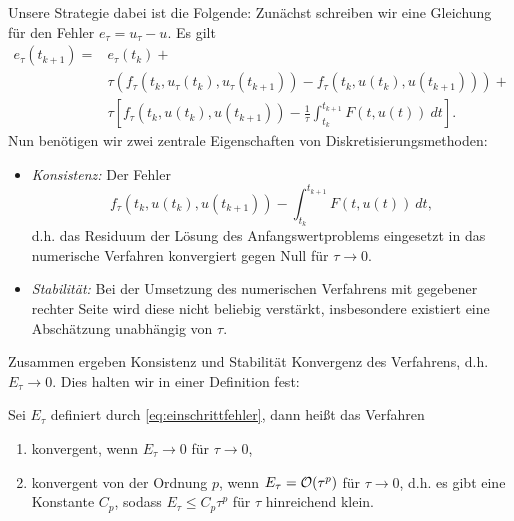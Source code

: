 Unsere Strategie dabei ist die Folgende: Zunächst schreiben wir eine Gleichung für den Fehler $e_\tau = u_\tau - u$. Es gilt
%
\begin{align*} 
e_\tau(t_{k+1}) =& e_\tau(t_k) +\\ 
&\tau (f_\tau(t_k,u_\tau(t_k),u_\tau(t_{k+1})) - f_\tau(t_k,u(t_k),u(t_{k+1}))) 
+ \\ & \tau 
\left[ f_\tau(t_k,u(t_k),u(t_{k+1})) - \frac{1}\tau \int_{t_k}^{t_{k+1}} F(t,u(t))~dt
\right]. 
\end{align*}
%
Nun benötigen wir zwei zentrale Eigenschaften von Diskretisierungsmethoden:
%
\begin{itemize}
\item {\em Konsistenz: } Der Fehler
$$ f_\tau(t_k,u(t_k),u(t_{k+1})) - \int_{t_k}^{t_{k+1}} F(t,u(t))~dt,$$
d.h. das Residuum der Lösung des Anfangswertproblems eingesetzt in das numerische Verfahren konvergiert gegen Null für $\tau \rightarrow 0$.
%
\item {\em Stabilität: } Bei der Umsetzung des numerischen Verfahrens mit gegebener rechter Seite wird diese nicht beliebig verstärkt, insbesondere existiert eine Abschätzung unabhängig von $\tau.$ 
\end{itemize}
%
Zusammen ergeben Konsistenz und Stabilität Konvergenz des Verfahrens, d.h. $E_\tau \rightarrow 0$. Dies halten wir in einer Definition fest:
%
\begin{definition}{}{}
Sei $E_\tau$ definiert durch \eqref{eq:einschrittfehler}, dann heißt das Verfahren
%
\begin{enumerate}[label=(\roman*)]
\item konvergent, wenn $E_\tau \rightarrow 0$ für $\tau \rightarrow 0$,
%
\item konvergent von der Ordnung $p$, wenn $E_\tau = {\cal O}(\tau^p)$ für $\tau \rightarrow 0$, d.h. es gibt eine Konstante $C_p$, sodass $E_\tau \leq C_p \tau^p$ für $\tau$ hinreichend klein. 
\end{enumerate}
\end{definition}
%
